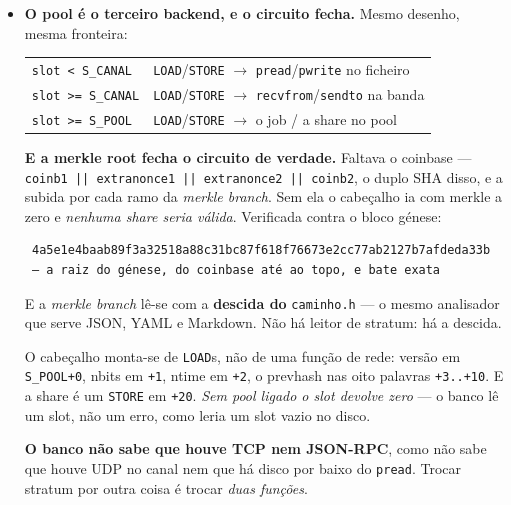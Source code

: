 \documentclass[11pt]{article}
\newcommand{\code}[1]{\texttt{\small #1}}
\theoremstyle{plain}
\theoremstyle{remark}
\begin{document}
\begin{itemize}
Um \code{Word} escrito num slot de canal atravessa a banda e volta inteiro, resíduo $0$, com o
\emph{slot a servir de endereço}. \textbf{A ISA não cresceu, o compilador não mudou, nenhuma linha
de SQL mudou.} Trocar UDP por STOMP ou por TCP é trocar \emph{duas funções} --- e a topologia da
comunicação é a mesma porque, deste lado, \emph{não há topologia}: há um endereço, e o endereço é
o slot.

\item \textbf{O pool é o terceiro backend, e o circuito fecha.} Mesmo desenho, mesma fronteira:

\begin{center}\begin{tabular}{@{}ll@{}}
\code{slot < S\_CANAL} & \code{LOAD}/\code{STORE} $\to$ \code{pread}/\code{pwrite} no ficheiro\\
\code{slot >= S\_CANAL} & \code{LOAD}/\code{STORE} $\to$ \code{recvfrom}/\code{sendto} na banda\\
\code{slot >= S\_POOL} & \code{LOAD}/\code{STORE} $\to$ o job / a share no pool\\
\end{tabular}\end{center}

\textbf{E a merkle root fecha o circuito de verdade.} Faltava o coinbase --- \code{coinb1 || extranonce1 || extranonce2 || coinb2}, o duplo SHA disso, e a subida por cada ramo da \emph{merkle branch}. Sem ela o cabeçalho ia com merkle a zero e \emph{nenhuma share seria válida}. Verificada contra o bloco génese:

\begin{verbatim}
 4a5e1e4baab89f3a32518a88c31bc87f618f76673e2cc77ab2127b7afdeda33b
 — a raiz do génese, do coinbase até ao topo, e bate exata
\end{verbatim}

E a \emph{merkle branch} lê-se com a \textbf{descida do} \code{caminho.h} --- o mesmo analisador que serve JSON, YAML e Markdown. Não há leitor de stratum: há a descida.

O cabeçalho monta-se de \code{LOAD}s, não de uma função de rede: versão em \code{S\_POOL+0}, nbits
em \code{+1}, ntime em \code{+2}, o prevhash nas oito palavras \code{+3..+10}. E a share é um
\code{STORE} em \code{+20}. \emph{Sem pool ligado o slot devolve zero} --- o banco lê um slot, não
um erro, como leria um slot vazio no disco.

\textbf{O banco não sabe que houve TCP nem JSON-RPC}, como não sabe que houve UDP no canal nem que
há disco por baixo do \code{pread}. Trocar stratum por outra coisa é trocar \emph{duas funções}.


\end{itemize}
\end{document}
